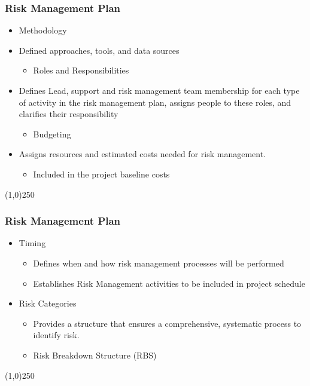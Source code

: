 \begin{frame}
\frametitle{Risk Management Plan}

\begin{itemize}
	\item Methodology
	\item Defined approaches, tools, and data sources
		\begin{itemize}
			\item Roles and Responsibilities
		\end{itemize}
		\item Defines Lead, support and risk management team membership for each type of activity in the risk management plan, assigns people to these roles, and clarifies their responsibility
		\begin{itemize}
			\item Budgeting
		\end{itemize}
		\item Assigns resources and estimated costs needed for risk management.
		\begin{itemize}
			\item Included in the project baseline costs
		\end{itemize}
\end{itemize}
\end{frame}\begin{center}\line(1,0){250}\end{center}





\begin{frame}
\frametitle{Risk Management Plan}

\begin{itemize}
	\item Timing
	\begin{itemize}
		\item Defines when and how risk management processes will be performed
		\item Establishes Risk Management activities to be included in project schedule
	\end{itemize}
	\item Risk Categories
	\begin{itemize}
		\item Provides a structure that ensures a comprehensive, systematic process to identify risk.
		\item Risk Breakdown Structure (RBS)
	\end{itemize}
\end{itemize}
\end{frame}\begin{center}\line(1,0){250}\end{center}




